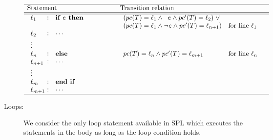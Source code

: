 \begin{description}
		\[
				\begin{array}[t]{p{8em}@{\hspace{6em}}p{\longtablesize}}
				\hline
				Statement & Transition relation \\ \hline\hline
				$\begin{array}[t]{l@{\hspace{0.3em}}c@{\hspace{1em}}l}
					\ell_1 & : & \mathtt{\textbf{if } c \textbf{ then }} \\ \\
					\ell_2 & : & \mathtt{\cdots} \\
					\mathtt{\vdots} \\
					\ell_n & : & \mathtt{\textbf{else}} \\
					\ell_{n+1} & : & \mathtt{\cdots} \\
					\mathtt{\vdots} \\
					\ell_m & : & \mathtt{\textbf{end if}} \\
					\ell_{m+1} & : & \mathtt{\cdots}
				\end{array}$
				&
				$\begin{array}[t]{ll}
					(\pc(T) = \ell_1 \andcond \;\;\mathtt{c} \andcond \pc'(T) = \ell_2) \; \Or \\
					(\pc(T) = \ell_1 \andcond \lnot \mathtt{c} \andcond \pc'(T) = \ell_{n+1})
						& \text{for line } \ell_1 \\ \\ \phantom{\vdots} \\

						\pc(T) = \ell_n \andcond \pc'(T) = \ell_{m+1} & \text{for line } \ell_n
				 \end{array}$ \\ \hline
			\end{array}
		\]

	\item [Loops:]
		We consider the only loop statement available in SPL which executes 
	the statements in the body as long as the loop condition holds.


\end{description}
